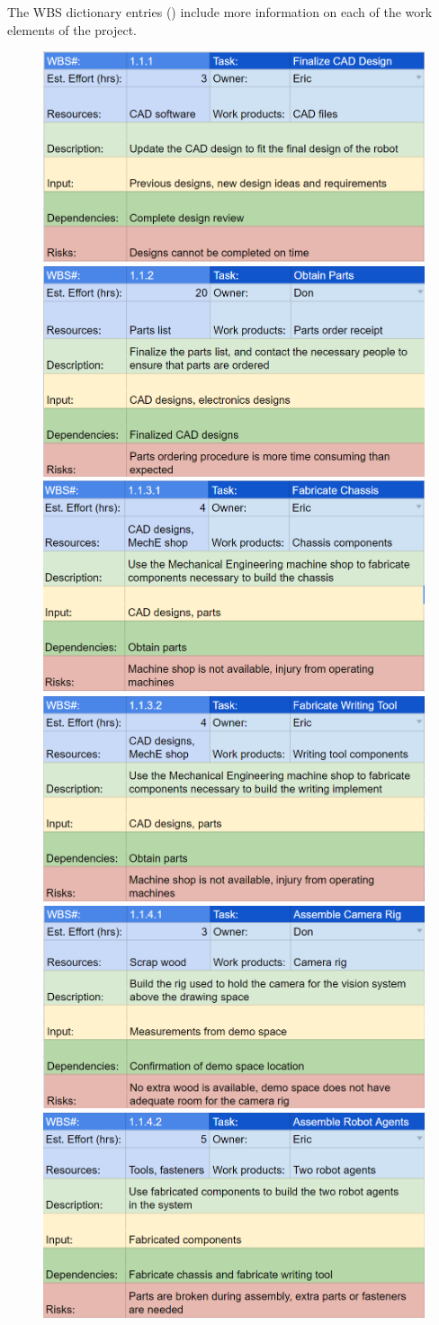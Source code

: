 The WBS dictionary entries () include more information on each of the work elements of the project. 

\begin{figure}[h!]
\centering
\includegraphics[width=0.49\columnwidth]{wbs_schedule/wbs_dict_hw1.PNG}
\includegraphics[width=0.49\columnwidth]{wbs_schedule/wbs_dict_hw2.PNG}
\includegraphics[width=0.49\columnwidth]{wbs_schedule/wbs_dict_hw3.PNG}
\includegraphics[width=0.49\columnwidth]{wbs_schedule/wbs_dict_hw4.PNG}
\includegraphics[width=0.49\columnwidth]{wbs_schedule/wbs_dict_hw5.PNG}
\includegraphics[width=0.49\columnwidth]{wbs_schedule/wbs_dict_hw6.PNG}

\end{figure}
